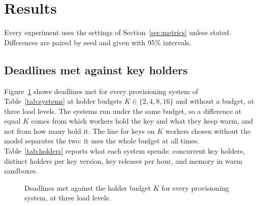 \section{Results}
\label{sec:results}

Every experiment uses the settings of Section~\ref{sec:metrics} unless stated. Differences are paired by seed and
given with 95\% intervals.

\subsection{Deadlines met against key holders}
\label{sec:res-main}

Figure~\ref{fig:main} shows deadlines met for every provisioning system of Table~\ref{tab:systems} at holder budgets
$K \in \{2, 4, 8, 16\}$ and without a budget, at three load levels. The systems run under the same budget, so a
difference at equal $K$ comes from which workers hold the key and what they keep warm, and not from how many hold it.
The line for keys on $K$ workers chosen without the model separates the two: it uses the whole budget at all times.
Table~\ref{tab:holders} reports what each system spends: concurrent key holders, distinct holders per key version,
key releases per hour, and memory in warm sandboxes.

\begin{figure}[t]
\centering
{}
\caption{Deadlines met against the holder budget $K$ for every provisioning system, at three load levels.}
\label{fig:main}
\end{figure}

